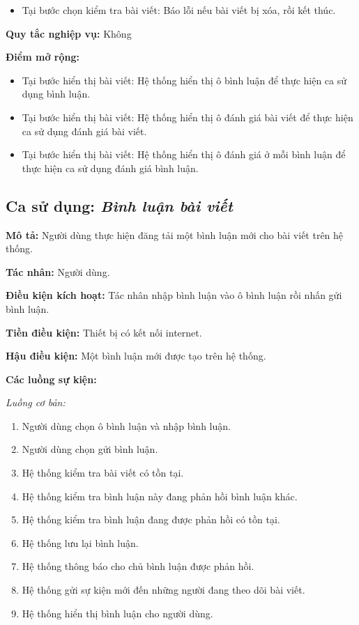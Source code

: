 \documentclass[../main.tex]{subfiles}
\begin{document}
\begin{itemize}
  \item Tại bước chọn kiểm tra bài viết: Báo lỗi nếu bài viết bị xóa, rồi kết thúc.
\end{itemize}

\noindent
\textbf{Quy tắc nghiệp vụ:} Không

\noindent
\textbf{Điểm mở rộng:}

\begin{itemize}
  \item Tại bước hiển thị bài viết: Hệ thống hiển thị ô bình luận để thực hiện ca sử dụng bình luận.
  \item Tại bước hiển thị bài viết: Hệ thống hiển thị ô đánh giá bài viết để thực hiện ca sử dụng đánh giá bài viết.
  \item Tại bước hiển thị bài viết: Hệ thống hiển thị ô đánh giá ở mỗi bình luận để thực hiện ca sử dụng đánh giá bình luận.
\end{itemize}

\subsection{Ca sử dụng: \textit{Bình luận bài viết}}

\noindent
\textbf{Mô tả:} Người dùng thực hiện đăng tải một bình luận mới cho bài viết trên hệ thống.

\noindent
\textbf{Tác nhân:} Người dùng.

\noindent
\textbf{Điều kiện kích hoạt:} Tác nhân nhập bình luận vào ô bình luận rồi nhấn gửi bình luận.

\noindent
\textbf{Tiền điều kiện:} Thiết bị có kết nối internet.

\noindent
\textbf{Hậu điều kiện:} Một bình luận mới được tạo trên hệ thống.

\noindent
\textbf{Các luồng sự kiện:}

\noindent
\textit{Luồng cơ bản:}

\begin{enumerate}[label=B\arabic{*}.]
    \item Người dùng chọn ô bình luận và nhập bình luận.
    \item Người dùng chọn gửi bình luận.
    \item Hệ thống kiểm tra bài viết có tồn tại.
    \item Hệ thống kiểm tra bình luận này đang phản hồi bình luận khác.
    \item Hệ thống kiểm tra bình luận đang được phản hồi có tồn tại. 
    \item Hệ thống lưu lại bình luận.
    \item Hệ thống thông báo cho chủ bình luận được phản hồi.
    \item Hệ thống gửi sự kiện mới đến những người đang theo dõi bài viết.
    \item Hệ thống hiển thị bình luận cho người dùng.
\end{enumerate}
\end{document}

